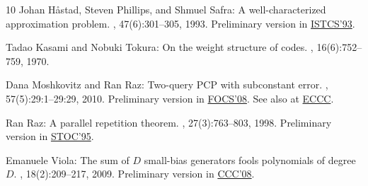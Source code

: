 \begin{thebibliography}{10}
{\sc Johan H{\aa}stad, Steven Phillips, and Shmuel Safra}: A well-characterized
  approximation problem.
, 47(6):301--305, 1993.
\newblock Preliminary version in
  \href{http://sceas.csd.auth.gr/php/conferences.php4?conf_id=6365}{ISTCS'93}.
\newblock [\epfmtdoi{10.1016/0020-0190(93)90076-L}]

{\sc Tadao Kasami and Nobuki Tokura}: On the weight structure of
   codes.
, 16(6):752--759, 1970.

{\sc Dana Moshkovitz and Ran Raz}: Two-query {PCP} with subconstant error.
, 57(5):29:1--29:29, 2010.
\newblock Preliminary version in
  \href{http://dx.doi.org/10.1109/FOCS.2008.60}{FOCS'08}. See also at
  \href{http://eccc.hpi-web.de/report/2008/071/}{ECCC}.
\newblock [\epfmtdoi{10.1145/1754399.1754402}]

{\sc Ran Raz}: A parallel repetition theorem.
, 27(3):763--803, 1998.
\newblock Preliminary version in
  \href{http://dx.doi.org/10.1145/225058.225181}{STOC'95}.
\newblock [\epfmtdoi{10.1137/S0097539795280895}]

{\sc Emanuele Viola}: The sum of {$D$} small-bias generators fools polynomials
  of degree {$D$}.
, 18(2):209--217, 2009.
\newblock Preliminary version in
  \href{http://dx.doi.org/10.1109/CCC.2008.16}{CCC'08}.
\newblock [\epfmtdoi{10.1007/s00037-009-0273-5}]

\end{thebibliography}

